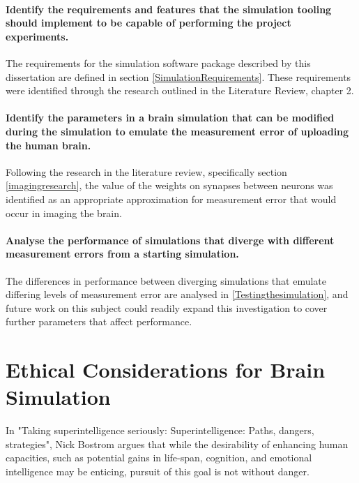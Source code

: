 \subsubsection{Identify the requirements and features that the simulation
      tooling should implement to be capable of performing the project
      experiments.}
The requirements for the simulation software package described by this dissertation are defined in section \ref{SimulationRequirements}. These requirements were identified through the research outlined in the Literature Review, chapter 2.

\subsubsection{Identify the parameters in a brain simulation that can be
      modified during the simulation to emulate the measurement error of
      uploading the human brain.}
Following the research in the literature review, specifically section \ref{imagingresearch}, the value of the weights on synapses between neurons was identified as an appropriate approximation for measurement error that would occur in imaging the brain. 

\subsubsection{Analyse the performance of simulations that diverge with
      different measurement errors from a starting simulation.}

The differences in performance between diverging simulations that emulate differing levels of measurement error are analysed in \ref{Testingthesimulation}, and future work on this subject could readily expand this investigation to cover further parameters that affect performance.

\chapter{Ethical Considerations for Brain Simulation}
\setlength{\epigraphwidth}{0.4\textwidth}

In "Taking superintelligence seriously: Superintelligence: Paths, dangers,
strategies", Nick Bostrom argues that while the desirability of enhancing human
capacities, such as potential gains in life-span, cognition, and emotional
intelligence may be enticing, pursuit of this goal is not without danger.
\autocite{bostrom_superintelligence_2014}

